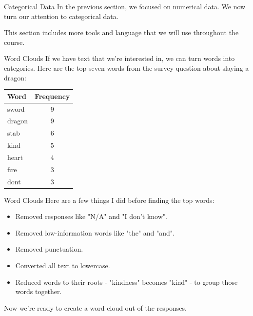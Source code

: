 \begin{frame}{Categorical Data}
    In the previous section, we focused on numerical data. We now turn our attention to categorical data. 
    
    \vspace{24pt}This section includes more tools and language that we will use throughout the course. 
\end{frame}

\begin{frame}{Word Clouds}
    If we have text that we're interested in, we can turn words into categories. Here are the top seven words from the survey question about slaying a dragon:
    
    \begin{center}
        \begin{tabular}{l c}
		    Word    & Frequency \\ \hline
            sword   & 9 \\
            dragon  & 9 \\
            stab    & 6 \\
            kind    & 5 \\
            heart   & 4 \\
            fire    & 3 \\
            dont    & 3 
        \end{tabular}
    \end{center}
\end{frame}

\begin{frame}{Word Clouds}
    Here are a few things I did before finding the top words:
    \begin{itemize}
        \item Removed responses like "N/A" and "I don't know".
        \item Removed low-information words like "the" and "and".
        \item Removed punctuation.
        \item Converted all text to lowercase.
        \item Reduced words to their roots - "kindness" becomes "kind" - to group those words together.
    \end{itemize}
    
    \vspace{12pt}Now we're ready to create a word cloud out of the responses.
\end{frame}

